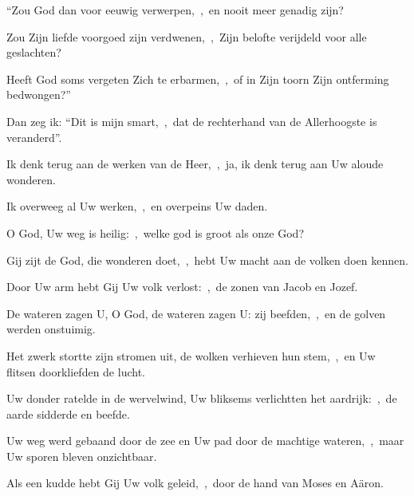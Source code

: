 \documentclass[12pt,twoside,a5paper]{article}
\begin{document}

\begin{halfparskip}
  ``Zou God dan voor eeuwig verwerpen,~\sep\ en nooit meer genadig zijn?

  Zou Zijn liefde voorgoed zijn verdwenen,~\sep\ Zijn belofte verijdeld voor alle geslachten?

  Heeft God soms vergeten Zich te erbarmen,~\sep\ of in Zijn toorn Zijn ontferming bedwongen?''

  Dan zeg ik: ``Dit is mijn smart,~\sep\ dat de rechterhand van de Allerhoogste is veranderd''.

  Ik denk terug aan de werken van de Heer,~\sep\ ja, ik denk terug aan Uw aloude wonderen.

  Ik overweeg al Uw werken,~\sep\ en overpeins Uw daden.
\end{halfparskip}


\begin{halfparskip}
  O God, Uw weg is heilig:~\sep\ welke god is groot als onze God?

  Gij zijt de God, die wonderen doet,~\sep\ hebt Uw macht aan de volken doen kennen.

  Door Uw arm hebt Gij Uw volk verlost:~\sep\ de zonen van Jacob en Jozef.

  De wateren zagen U, O God, de wateren zagen U: zij beefden,~\sep\ en de golven werden onstuimig.

  Het zwerk stortte zijn stromen uit, de wolken verhieven hun stem,~\sep\ en Uw flitsen doorkliefden de lucht.

  Uw donder ratelde in de wervelwind, Uw bliksems verlichtten het aardrijk:~\sep\ de aarde sidderde en beefde.

  Uw weg werd gebaand door de zee en Uw pad door de machtige wateren,~\sep\ maar Uw sporen bleven  onzichtbaar.

  Als een kudde hebt Gij Uw volk geleid,~\sep\ door de hand van Moses en Aäron.
\end{halfparskip}



\end{document}

